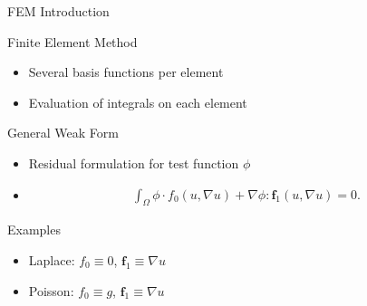 

\begin{frame}{FEM Introduction}

 \begin{block}{Finite Element Method}
  \begin{itemize}
   \item Several basis functions per element
   \item Evaluation of integrals on each element
  \end{itemize}
 \end{block}

 \begin{block}{General Weak Form}
  \begin{itemize}
   \item Residual formulation for test function $\phi$
   \item \begin{align*}
    \int_\Omega \phi\cdot f_0(u,\nabla u) + \nabla\phi:\mathbf{f}_1(u,\nabla u) = 0.
         \end{align*}

  \end{itemize}
 \end{block}

  \begin{block}{Examples}
  \begin{itemize}
   \item Laplace: $f_0 \equiv 0$, $\mathbf{f}_1 \equiv \nabla u$
   \item Poisson: $f_0 \equiv g$, $\mathbf{f}_1 \equiv \nabla u$
  \end{itemize}
 \end{block}

\end{frame}



